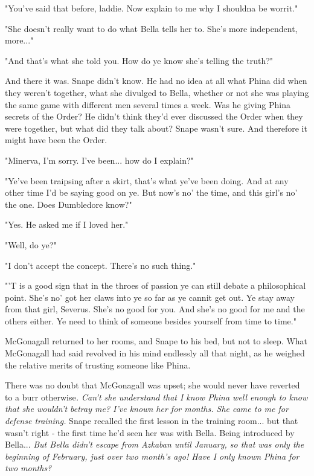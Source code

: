 \documentclass[a4paper,11pt]{article}
\begin{document}
"You've said that before, laddie. Now explain to me why I shouldna be worrit."

"She doesn't really want to do what Bella tells her to. She's more independent, more..."

"And that's what she told you. How do ye know she's telling the truth?"

And there it was. Snape didn't know. He had no idea at all what Phina did when they weren't together, what she divulged to Bella, whether or not she was playing the same game with different men several times a week. Was he giving Phina secrets of the Order? He didn't think they'd ever discussed the Order when they were together, but what did they talk about? Snape wasn't sure. And therefore it might have been the Order.

"Minerva, I'm sorry. I've been... how do I explain?"

"Ye've been traipsing after a skirt, that's what ye've been doing. And at any other time I'd be saying good on ye. But now's no' the time, and this girl's no' the one. Does Dumbledore know?"

"Yes. He asked me if I loved her."

"Well, do ye?"

"I don't accept the concept. There's no such thing."

"'T is a good sign that in the throes of passion ye can still debate a philosophical point. She's no' got her claws into ye so far as ye cannit get out. Ye stay away from that girl, Severus. She's no good for you. And she's no good for me and the others either. Ye need to think of someone besides yourself from time to time."

McGonagall returned to her rooms, and Snape to his bed, but not to sleep. What McGonagall had said revolved in his mind endlessly all that night, as he weighed the relative merits of trusting someone like Phina.

There was no doubt that McGonagall was upset; she would never have reverted to a burr otherwise\emph{. Can't she understand that I know Phina well enough to know that she wouldn't betray me? I've known her for months. She came to me for defense training.} Snape recalled the first lesson in the training room... but that wasn't right - the first time he'd seen her was with Bella. Being introduced by Bella... \emph{But Bella didn't escape from Azkaban until January, so that was only the beginning of February, just over two month's ago! Have I only known Phina for two months?}
\end{document}
